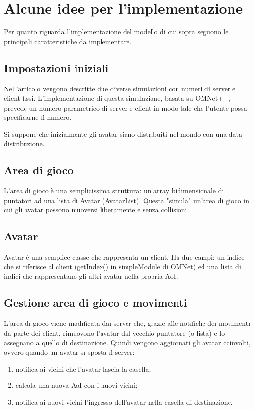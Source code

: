 \documentclass{article}
\begin{document}
\section{Alcune idee per l'implementazione}

Per quanto riguarda l'implementazione del modello di cui sopra seguono le
principali caratteristiche da implementare.

\subsection{Impostazioni iniziali}
Nell'articolo vengono descritte due diverse simulazioni con numeri di server
e client fissi. L'implementazione di questa simulazione, basata su OMNet++,
prevede un numero parametrico di server e client in modo tale che l'utente
possa specificarne il numero. 

Si suppone che inizialmente gli avatar siano distribuiti nel mondo con una
data distribuzione.

\subsection{Area di gioco}
L'area di gioco è una semplicissima struttura: un array
bidimensionale di puntatori ad una lista di Avatar (AvatarList). Questa
"simula" un'area di gioco in cui gli avatar possono muoversi liberamente e
senza collisioni.

\subsection{Avatar}
Avatar è una semplice classe che rappresenta un client. Ha due campi:
un indice che si riferisce al client (getIndex() in simpleModule di OMNet) ed
una lista di indici che rappresentano gli altri avatar nella propria AoI.

\subsection{Gestione area di gioco e movimenti}
L'area di gioco viene modificata dai server che, grazie alle notifiche dei
movimenti da parte dei client, rimuovono l'avatar dal vecchio puntatore
(o lista) e lo assegnano a quello di destinazione. Quindi vengono aggiornati
gli avatar coinvolti, ovvero quando un avatar si sposta il server:
\begin{enumerate}
\item
notifica ai vicini che l'avatar lascia la casella;
\item
calcola una nuova AoI con i nuovi vicini;
\item
notifica ai nuovi vicini l'ingresso dell'avatar nella casella di
destinazione.
\end{enumerate}
\end{document}
